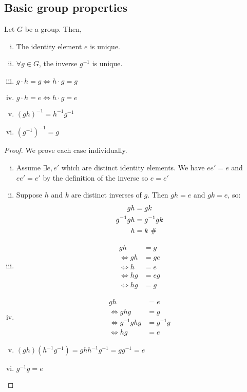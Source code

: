 \subsection{Basic group properties}
\begin{proposition}
	Let \(G\) be a group.
	Then,
	\begin{enumerate}[i.]
		\item The identity element \(e\) is unique.
		\item \(\forall g \in G\), the inverse \(g^{-1}\) is unique.
		\item \(g \cdot h = g \iff h \cdot g = g\)
		\item \(g \cdot h = e \iff h \cdot g = e\)
		\item \((gh)^{-1} = h^{-1} g^{-1}\)
		\item \((g^{-1})^{-1} = g\)
	\end{enumerate}
\end{proposition}
\begin{proof}
	We prove each case individually.
	\begin{enumerate}[i.]
		\item Assume \(\exists e, e'\) which are distinct identity elements.
		      We have \(e e' = e\) and \(e e' = e'\) by the definition of the inverse so \(e = e'\) \contradiction{}
		\item Suppose \(h\) and \(k\) are distinct inverses of \(g\).
		      Then \(gh = e\) and \(gk = e\), so:
		      \begin{align*}
			      gh        & = gk                       \\
			      g^{-1} gh & = g^{-1} gk                \\
			      h         & = k \text{ \(\#\)}
		      \end{align*}
		\item \begin{align*}
			      gh      & = g  \\
			      \iff gh & = ge \\
			      \iff h  & = e  \\
			      \iff hg & = eg \\
			      \iff hg & = g
		      \end{align*}
		\item \begin{align*}
			      gh              & = e       \\
			      \iff ghg        & = g       \\
			      \iff g^{-1} ghg & = g^{-1}g \\
			      \iff hg         & = e
		      \end{align*}
		\item \((gh) (h^{-1}g^{-1}) = g h h^{-1} g^{-1} = g g^{-1} = e\)
		\item \(g^{-1} g = e\)
	\end{enumerate}
\end{proof}

